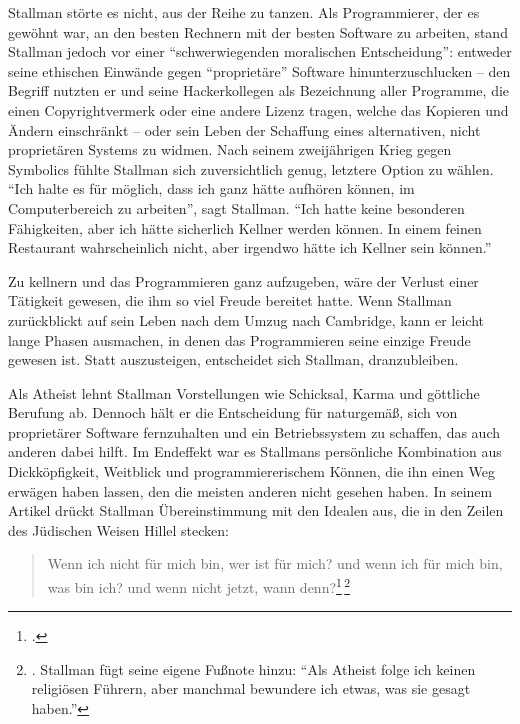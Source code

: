 Stallman störte es nicht, aus der Reihe zu tanzen. Als Programmierer, der es gewöhnt war, an den besten Rechnern mit der besten Software zu arbeiten, stand Stallman jedoch vor einer "`schwerwiegenden moralischen Entscheidung"': entweder seine ethischen Einwände gegen "`proprietäre"' Software hinunterzuschlucken – den Begriff nutzten er und seine Hackerkollegen als Bezeichnung aller Programme, die einen Copyrightvermerk oder eine andere Lizenz tragen, welche das Kopieren und Ändern einschränkt  – oder sein Leben der Schaffung eines alternativen, nicht proprietären Systems zu widmen. Nach seinem zweijährigen Krieg gegen Symbolics fühlte  Stallman sich zuversichtlich genug, letztere Option zu wählen. "`Ich halte es für möglich, dass ich ganz hätte aufhören können, im Computerbereich zu arbeiten"', sagt Stallman. "`Ich hatte keine besonderen Fähigkeiten, aber ich hätte sicherlich Kellner werden können. In einem feinen Restaurant wahrscheinlich nicht, aber irgendwo hätte ich Kellner sein können."'

Zu kellnern und das Programmieren ganz aufzugeben, wäre der Verlust einer Tätigkeit gewesen, die ihm so viel Freude bereitet hatte. Wenn Stallman zurückblickt auf sein Leben nach dem Umzug nach Cambridge, kann er leicht lange Phasen ausmachen, in denen das Programmieren seine einzige Freude gewesen ist. Statt auszusteigen, entscheidet sich Stallman, dranzubleiben.

Als Atheist lehnt Stallman Vorstellungen wie Schicksal, Karma und göttliche Berufung ab. Dennoch hält er die Entscheidung für naturgemäß, sich von proprietärer Software fernzuhalten und ein Betriebssystem zu schaffen, das auch anderen dabei hilft. Im Endeffekt war es Stallmans persönliche Kombination aus Dickköpfigkeit, Weitblick und programmiererischem Können, die ihn einen Weg erwägen haben lassen, den die meisten anderen nicht gesehen haben. In seinem Artikel  drückt Stallman Übereinstimmung mit den Idealen aus, die in den Zeilen des Jüdischen Weisen Hillel stecken:

\begin{quote}
Wenn ich nicht für mich bin, wer ist für mich? und wenn ich für mich bin, was bin ich? und wenn nicht jetzt, wann denn?\footcite[Vgl.][S.\,108 Mischna XII.-XIV]{thalmud}\,\footnote{\cite[Vgl.][]{rmsgnupr}. Stallman fügt seine eigene Fußnote hinzu: "`Als Atheist folge ich keinen religiösen Führern, aber manchmal bewundere ich etwas, was sie gesagt haben."'}
\end{quote}

